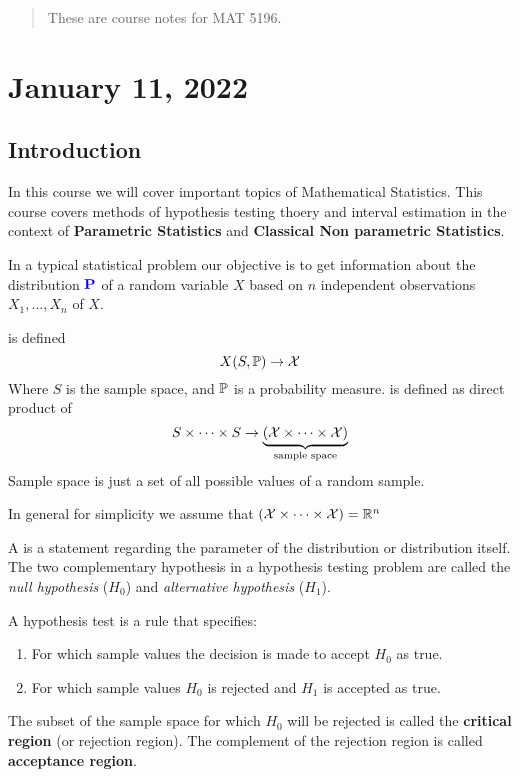 \begin{abstract}
    These are course notes for MAT 5196.
\end{abstract}

\section{January 11, 2022}
\subsection{Introduction}
In this course we will cover important topics of Mathematical Statistics. This course covers methods of hypothesis testing thoery and interval estimation in the context of \textbf{Parametric Statistics} and \textbf{Classical Non parametric Statistics}.

In a typical statistical problem our objective is to get information about the distribution $\textbf{\color{blue} P}$ of a random variable $X$ based on $n$ independent observations $X_1,...,X_n$ of $X$. 

\begin{definition}
 is defined 
$$
X(S,\mathbb P) \to \mathcal X
$$
Where $S$ is the sample space, and $\mathbb P$ is a probability measure.
 is defined as direct product of 
$$
S \times \cdots \times S \to \underbrace{(\mathcal X \times \cdots \times \mathcal X)}_\text{sample space}
$$
Sample space is just a set of all possible values of a random sample.
\end{definition}
In general for simplicity we assume that $(\mathcal X \times \cdots \times \mathcal X) = \mathbb R^n$

A  is a statement regarding the parameter of the distribution or distribution itself. The two complementary hypothesis in a hypothesis testing problem are called the \textit{null hypothesis} ($H_0$) and \textit{alternative hypothesis} ($H_1$).
\begin{definition}
    A hypothesis test is a rule that specifies:
    \begin{enumerate}[i]
        \item For which sample values the decision is made to accept $H_0$ as true.
        \item For which sample values $H_0$ is rejected and $H_1$ is accepted as true. 
    \end{enumerate}
\end{definition}
The subset of the sample space for which $H_0$ will be rejected is called the \textbf{critical region} (or rejection region). The complement of the rejection region is called \textbf{acceptance region}.

